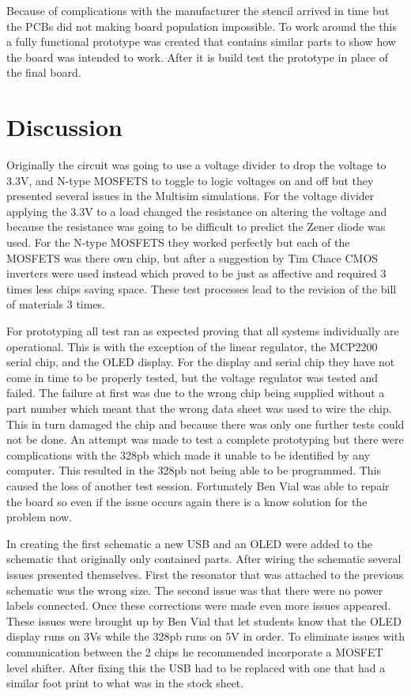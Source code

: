 \documentclass[12pt]{article}
\begin{document}
        \newpage

        \par Because of complications with the manufacturer the stencil arrived in time but the PCBs did not making board population impossible. To work around the this a fully functional prototype was created that contains similar parts to show how the board was intended to work. After it is build test the prototype in place of the final board.

    \section{Discussion}
    Originally the circuit was going to use a voltage divider to drop the voltage to 3.3V, and N-type MOSFETS to toggle to logic voltages on and off but they presented several issues in the Multisim simulations. For the voltage divider applying the 3.3V to a load changed the resistance on altering the voltage and because the resistance was going to be difficult to predict the Zener diode was used. For the N-type MOSFETS they worked perfectly but each of the MOSFETS was there own chip, but after a suggestion by Tim Chace CMOS inverters were used instead which proved to be just as affective and required 3 times less chips saving space. These test processes lead to the revision of the bill of materials 3 times.
    \par For prototyping all test ran as expected proving that all systems individually are operational. This is with the exception of the linear regulator, the MCP2200 serial chip, and the OLED display.
    For the display and serial chip they have not come in time to be properly tested, but the voltage regulator was tested and failed. The failure at first was due to the wrong chip being supplied without a part number which meant that the wrong data sheet was used to wire the chip. This in turn damaged the chip and because there was only one further tests could not be done. An attempt was made to test a complete prototyping but there were complications with the 328pb which made it unable to be identified by any computer. This resulted in the 328pb not being able to be programmed. This caused the loss of another test session. Fortunately Ben Vial was able to repair the board so even if the issue occurs again there is a know solution for the problem now.
    \par In creating the first schematic a new USB and an OLED were added to the schematic that originally only contained parts. After wiring the schematic several issues presented themselves. First the resonator that was attached to the previous schematic was the wrong size. The second issue was that there were no power labels connected. Once these corrections were made even more issues appeared. These issues were brought up by Ben Vial that let students know that the OLED display runs on 3Vs while the 328pb runs on 5V in order. To eliminate issues with communication between the 2 chips he recommended incorporate a MOSFET level shifter. After fixing this the USB had to be replaced with one that had a similar foot print to what was  in the stock sheet.
\end{document}
